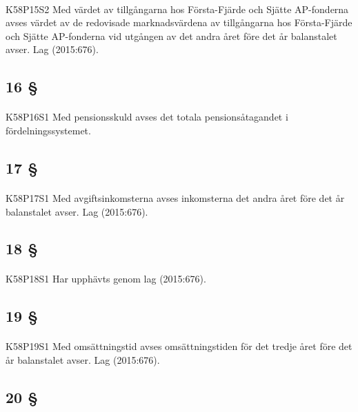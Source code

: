 \documentclass[a4paper,notitlepage,openany,10pt]{book}
\begin{document}
\paragraph*{}
{\tiny K58P15S2}
Med värdet av tillgångarna hos Första-Fjärde och Sjätte AP-fonderna avses värdet av de redovisade marknadsvärdena av tillgångarna hos Första-Fjärde och Sjätte AP-fonderna vid utgången av det andra året före det år balanstalet avser.
Lag (2015:676).
\subsection*{16 §}
\paragraph*{}
{\tiny K58P16S1}
Med pensionsskuld avses det totala pensionsåtagandet i fördelningssystemet.
\subsection*{17 §}
\paragraph*{}
{\tiny K58P17S1}
Med avgiftsinkomsterna avses inkomsterna det andra året före det år balanstalet avser.
Lag (2015:676).
\subsection*{18 §}
\paragraph*{}
{\tiny K58P18S1}
Har upphävts genom
lag (2015:676).
\subsection*{19 §}
\paragraph*{}
{\tiny K58P19S1}
Med omsättningstid avses omsättningstiden för det tredje året före det år balanstalet avser.
Lag (2015:676).
\subsection*{20 §}
\end{document}
